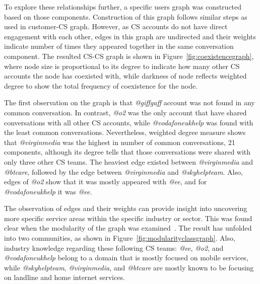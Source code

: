 \documentclass[sigconf]{acmart}
\begin{document}
To explore these relationships further, a specific users graph was
constructed based on those components. Construction of this graph
follows similar steps as used in customer-CS graph. However, as CS
accounts do not have direct engagement with each other, edges in this
graph are undirected and their weights indicate number of times they
appeared together in the same conversation component.  The resulted
CS-CS graph is shown in Figure~\ref{fig:coexistencegraph}, where node
size is proportional to its degree to indicate how many other CS accounts the
node has coexisted with, while darkness of node reflects weighted
degree to show the total frequency of coexistence for the node.

The first observation on the graph is that {\emph{@giffgaff}} account
was not found in any common conversation. In contrast, {\emph{@o2}}
was the only account that have shared conversations with all other CS
accounts, while {\emph{@vodafoneukhelp}} was found with the least
common conversations. Nevertheless, weighted degree measure shows that
{\emph{@virginmedia}} was the highest in number of common
conversations, 21 components, although its degree tells that those
conversations were shared with only three other CS teams. The heaviest
edge existed between {\emph{@virginmedia}} and {\emph{@btcare}},
followed by the edge between {\emph{@virginmedia}} and
{\emph{@skyhelpteam}}. Also, edges of {\emph{@o2}} show that it was
mostly appeared with {\emph{@ee}}, and for {\emph{@vodafoneukhelp}} it
was {\emph{@ee}}.

The observation of edges and their weights can provide insight into
uncovering more specific service areas within the specific industry or
sector. This was found clear when the modularity of the graph was
examined~\cite{Blondel2008}. The result has unfolded into two
communities, as shown in Figure~\ref{fig:modularityclassgraph}. Also,
industry knowledge regarding these following CS teams: {\emph{@ee}},
{\emph{@o2}}, and {\emph{@vodafoneukhelp}} belong to a domain that is
mostly focused on mobile services, while {\emph{@skyhelpteam}},
{\emph{@virginmedia}}, and {\emph{@btcare}} are mostly known to be
focusing on landline and home internet services.
\end{document}
